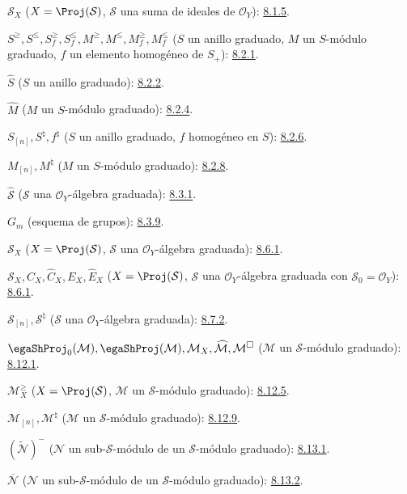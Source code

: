 \documentclass[oneside,10pt]{amsart}
\renewcommand{\leq}{\leqslant}
\renewcommand{\geq}{\geqslant}
\begin{document}
$\mathcal{S}_X$ ($X=\Proj(\mathcal{S})$, $\mathcal{S}$ una suma de ideales de
$\mathcal{O}_Y$): \hyperref[II.8.1.5-fr]{8.1.5}.

$S^\geq,S^\leq,S_f^\geq,S_f^\leq,
M^\geq,M^\leq,M_f^\geq,M_f^\leq$
($S$ un anillo graduado, $M$ un $S$-módulo graduado,
$f$ un elemento homogéneo de $S_+$): \hyperref[II.8.2.1-fr]{8.2.1}.

$\widehat S$ ($S$ un anillo graduado): \hyperref[II.8.2.2-fr]{8.2.2}.

$\widehat M$ ($M$ un $S$-módulo graduado): \hyperref[II.8.2.4-fr]{8.2.4}.

$S_{[n]},S^\natural,f^\natural$
($S$ un anillo graduado, $f$ homogéneo en $S$): \hyperref[II.8.2.6-fr]{8.2.6}.

$M_{[n]},M^\natural$ ($M$ un $S$-módulo graduado): \hyperref[II.8.2.8-fr]{8.2.8}.

$\widehat{\mathcal{S}}$ ($\mathcal{S}$ una $\mathcal{O}_Y$-álgebra graduada): \hyperref[II.8.3.1-fr]{8.3.1}.

$G_m$ (esquema de grupos): \hyperref[II.8.3.9-fr]{8.3.9}.

$\mathcal{S}_X$ ($X=\Proj(\mathcal{S})$, $\mathcal{S}$ una $\mathcal{O}_Y$-álgebra graduada): \hyperref[II.8.6.1-fr]{8.6.1}.

$\mathcal{S}_X,C_X,\widehat C_X,E_X,\widehat E_X$
($X=\Proj(\mathcal{S})$, $\mathcal{S}$ una $\mathcal{O}_Y$-álgebra graduada
con $\mathcal{S}_0=\mathcal{O}_Y$): \hyperref[II.8.6.1-fr]{8.6.1}.

$\mathcal{S}_{[n]},\mathcal{S}^{\natural}$
($\mathcal{S}$ una $\mathcal{O}_Y$-álgebra graduada): \hyperref[II.8.7.2-fr]{8.7.2}.

$\egaShProj_0(\mathcal{M}),\egaShProj(\mathcal{M}),\mathcal{M}_X,
\widehat{\mathcal{M}},\mathcal{M}^{\square}$
($\mathcal{M}$ un $\mathcal{S}$-módulo graduado): \hyperref[II.8.12.1-fr]{8.12.1}.

$\mathcal{M}_X^\geq$
($X=\Proj(\mathcal{S})$, $\mathcal{M}$ un $\mathcal{S}$-módulo graduado): \hyperref[II.8.12.5-fr]{8.12.5}.

$\mathcal{M}_{[n]},\mathcal{M}^{\natural}$
($\mathcal{M}$ un $\mathcal{S}$-módulo graduado): \hyperref[II.8.12.9-fr]{8.12.9}.

$(\widetilde{\mathcal{N}})^-$
($\mathcal{N}$ un sub-$\mathcal{S}$-módulo de un $\mathcal{S}$-módulo graduado): \hyperref[II.8.13.1-fr]{8.13.1}.

$\overline{\mathcal{N}}$
($\mathcal{N}$ un sub-$\mathcal{S}$-módulo de un $\mathcal{S}$-módulo graduado): \hyperref[II.8.13.2-fr]{8.13.2}.
\end{document}
